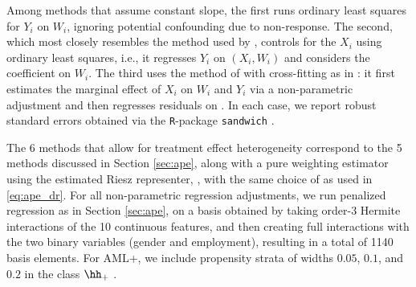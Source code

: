 \documentclass[aos,submission]{imsart}
\theoremstyle{plain}
\theoremstyle{remark}
\newcommand{\hriesz}[1][]{\ifthenelse{\equal{#1}{}}{\hgamma}{\hgamma_{{#1}}}}
\begin{document}
Among methods that assume constant slope, the first runs ordinary least squares for $Y_i$ on $W_i$, ignoring potential confounding due to
non-response. The second, which most closely resembles the method used by \citet*{imbens2001estimating},
controls for the $X_i$ using ordinary least squares, i.e., it regresses $Y_i$ on $(X_i, W_i)$ and considers the coefficient on $W_i$.
The third uses the method of \citet{robinson1988root} with cross-fitting as in \citet{chernozhukov2016double}:
it first estimates the marginal effect of $X_i$ on $W_i$ and $Y_i$ via a non-parametric adjustment and then
regresses residuals  on .
In each case, we report robust standard errors obtained via the \texttt{R}-package \texttt{sandwich} \citep{sandwich}.

The 6 methods that allow for treatment effect heterogeneity correspond to the 5 methods discussed
in Section \ref{sec:ape}, along with a pure weighting estimator using the estimated Riesz representer,
\smash{$\hpsi = n^{-1} \sum_{i = 1}^n \hriesz[\psi](X_i) Y_i$}, with the same choice of
\smash{$\hriesz[\psi](\cdot)$} as used in \eqref{eq:ape_dr}.
For all non-parametric regression adjustments, we run penalized regression as in Section \ref{sec:ape},
on a basis obtained by taking order-3 Hermite interactions of the 10 continuous features, and then
creating full interactions with the two binary variables (gender and employment), resulting in a total
of 1140 basis elements. For AML+, we include propensity
strata of widths $0.05$, $0.1$, and $0.2$ in the class $\hh_+$ .
\end{document}
